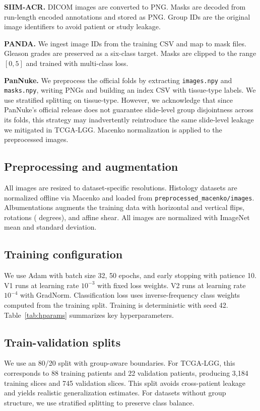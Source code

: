 \documentclass[conference,a4paper]{IEEEtran}
\begin{document}
\textbf{SIIM-ACR.} DICOM images are converted to PNG. Masks are decoded from run-length encoded annotations and stored as PNG. Group IDs are the original image identifiers to avoid patient or study leakage.

\textbf{PANDA.} We ingest image IDs from the training CSV and map to mask files. Gleason grades are preserved as a six-class target. Masks are clipped to the range $[0,5]$ and trained with multi-class loss.

\textbf{PanNuke.} We preprocess the official folds by extracting \texttt{images.npy} and \texttt{masks.npy}, writing PNGs and building an index CSV with tissue-type labels. We use stratified splitting on tissue-type. However, we acknowledge that since PanNuke's official release does not guarantee slide-level group disjointness across its folds, this strategy may inadvertently reintroduce the same slide-level leakage we mitigated in TCGA-LGG. Macenko normalization is applied to the preprocessed images.

\subsection{Preprocessing and augmentation}
All images are resized to dataset-specific resolutions. Histology datasets are normalized offline via Macenko and loaded from \texttt{preprocessed\_macenko/images}. Albumentations augments the training data with horizontal and vertical flips, rotations ( degrees), and affine shear. All images are normalized with ImageNet mean and standard deviation.

\subsection{Training configuration}
We use Adam with batch size 32, 50 epochs, and early stopping with patience 10. V1 runs at learning rate $10^{-3}$ with fixed loss weights. V2 runs at learning rate $10^{-4}$ with GradNorm. Classification loss uses inverse-frequency class weights computed from the training split. Training is deterministic with seed 42. Table~\ref{tab:hparams} summarizes key hyperparameters.

\subsection{Train-validation splits}
We use an 80/20 split with group-aware boundaries. For TCGA-LGG, this corresponds to 88 training patients and 22 validation patients, producing 3,184 training slices and 745 validation slices. This split avoids cross-patient leakage and yields realistic generalization estimates. For datasets without group structure, we use stratified splitting to preserve class balance.
\end{document}
